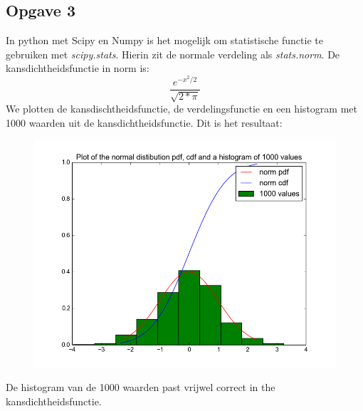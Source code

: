\documentclass[a4paper,12px]{article}
\begin{document}
\subsection{Opgave 3}
In python met Scipy en Numpy is het mogelijk om statistische functie te
 gebruiken met \textit{scipy.stats}. Hierin zit de normale verdeling als
 \textit{stats.norm}. De kansdichtheidsfunctie in norm is:
\begin{equation}
	\dfrac{e^{-x^2/2}}{\sqrt{2*\pi}}
\end{equation}
We plotten de kansdischtheidsfunctie, de verdelingsfunctie en een histogram
 met 1000 waarden uit de kansdichtheidsfunctie. Dit is het resultaat:
\begin{figure}[!h]
    \centering
    \includegraphics[width=\textwidth]{fig.png}
\end{figure}
\FloatBarrier
De histogram van de 1000 waarden past vrijwel correct in the
 kansdichtheidsfunctie.



% 
% 
\end{document}
